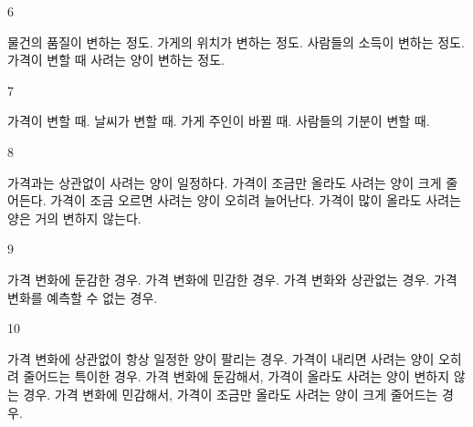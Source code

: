 \documentclass[fs9,seriesFre]{korfarm-base}
\begin{document}
\begin{kfSentenceUnit}{6}{}
\begin{kfChoices}
\kfChoice 물건의 품질이 변하는 정도.
\kfChoice 가게의 위치가 변하는 정도.
\kfChoice 사람들의 소득이 변하는 정도.
\kfChoice 가격이 변할 때 사려는 양이 변하는 정도.
\end{kfChoices}
\end{kfSentenceUnit}

\begin{kfSentenceUnit}{7}{}
\begin{kfChoices}
\kfChoice 가격이 변할 때.
\kfChoice 날씨가 변할 때.
\kfChoice 가게 주인이 바뀔 때.
\kfChoice 사람들의 기분이 변할 때.
\end{kfChoices}
\end{kfSentenceUnit}

\begin{kfSentenceUnit}{8}{}
\begin{kfChoices}
\kfChoice 가격과는 상관없이 사려는 양이 일정하다.
\kfChoice 가격이 조금만 올라도 사려는 양이 크게 줄어든다.
\kfChoice 가격이 조금 오르면 사려는 양이 오히려 늘어난다.
\kfChoice 가격이 많이 올라도 사려는 양은 거의 변하지 않는다.
\end{kfChoices}
\end{kfSentenceUnit}

\begin{kfSentenceUnit}{9}{}
\begin{kfChoices}
\kfChoice 가격 변화에 둔감한 경우.
\kfChoice 가격 변화에 민감한 경우.
\kfChoice 가격 변화와 상관없는 경우.
\kfChoice 가격 변화를 예측할 수 없는 경우.
\end{kfChoices}
\end{kfSentenceUnit}

\begin{kfSentenceUnit}{10}{}
\begin{kfChoices}
\kfChoice 가격 변화에 상관없이 항상 일정한 양이 팔리는 경우.
\kfChoice 가격이 내리면 사려는 양이 오히려 줄어드는 특이한 경우.
\kfChoice 가격 변화에 둔감해서, 가격이 올라도 사려는 양이 변하지 않는 경우.
\kfChoice 가격 변화에 민감해서, 가격이 조금만 올라도 사려는 양이 크게 줄어드는 경우.
\end{kfChoices}
\end{kfSentenceUnit}
\end{document}
